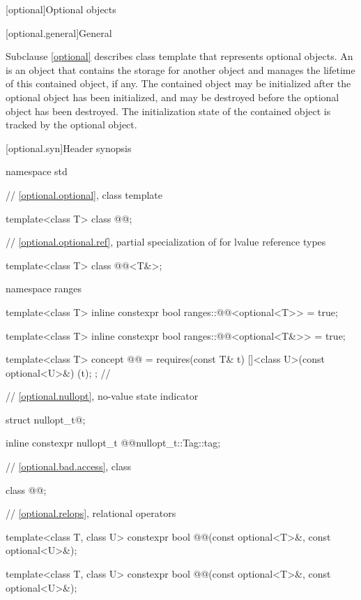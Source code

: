 [optional]{Optional objects}

[optional.general]{General}

\pnum
Subclause \ref{optional} describes class template  that represents optional objects. An  is an object that contains the storage for another object and manages the lifetime of this contained object, if any. The contained object may be initialized after the optional object has been initialized, and may be destroyed before the optional object has been destroyed. The initialization state of the contained object is tracked by the optional object.

[optional.syn]{Header  synopsis}

\begin{codeblock}
namespace std {
  // \ref{optional.optional}, class template 

  template<class T> class @@;

  // \ref{optional.optional.ref}, partial specialization of  for lvalue reference types

  template<class T> class @@<T&>;

  namespace ranges {
    template<class T> inline constexpr bool ranges::@@<optional<T>> = true;

    template<class T>
    inline constexpr bool ranges::@@<optional<T&>> = true;
  }

  template<class T>
  concept @@ = requires(const T& t) {
    []<class U>(const optional<U>&) {}(t);
  }; // \expos

  // \ref{optional.nullopt}, no-value state indicator

  struct nullopt_t{@\seebelow@};

  inline constexpr nullopt_t @@{nullopt_t::Tag::tag};

  // \ref{optional.bad.access}, class 

  class @@;

  // \ref{optional.relops}, relational operators

  template<class T, class U>
  constexpr bool @@(const optional<T>&, const optional<U>&);

  template<class T, class U>
  constexpr bool @@(const optional<T>&, const optional<U>&);

}
\end{codeblock}
